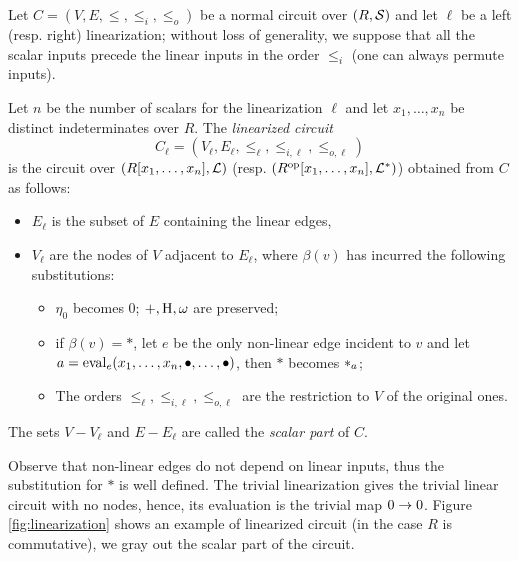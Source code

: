 \begin{definition}
  Let $C=(V,E,\le,\le_i,\le_o)$ be a normal circuit over $(R,\mathcal{S})$
  and let $\ell$ be a left (resp. right) linearization; without loss
  of generality, we suppose that all the scalar inputs precede the
  linear inputs in the order $\le_i$ (one can always permute inputs).
  
  Let $n$ be the number of scalars for the linearization $\ell$ and
  let $x_1,\ldots,x_n$ be distinct indeterminates over $R$. The
  \emph{linearized circuit}
  \begin{equation*}
    C_\ell=(V_\ell,E_\ell,\le_\ell,\le_{i,\ell},\le_{o,\ell})
  \end{equation*}
  is the circuit over $(R[x_1,\ldots,x_n], \mathcal{L})$
  (resp. $(R^{\mathrm{op}}[x_1,\ldots,x_n],\mathcal{L}^\ast)$) obtained from $C$
  as follows:
  \begin{itemize}
  \item $E_\ell$ is the subset of $E$ containing the linear edges,
  \item $V_\ell$ are the nodes of $V$ adjacent to $E_\ell$, where
    $\beta(v)$ has incurred the following substitutions:
    \begin{itemize}
    \item $\eta_0$ becomes $0$; $+, \operatorname{H}, \omega$ are preserved;
    \item if $\beta(v)=*$, let $e$ be the only non-linear edge
      incident to $v$ and let
      $a=\operatorname{eval}_e(x_1,\ldots,x_n,\bullet,\ldots,\bullet)$, then $*$
      becomes $*_{a}$;
    \item The orders $\le_\ell,\le_{i,\ell},\le_{o,\ell}$ are the
      restriction to $V$ of the original ones.
    \end{itemize}
  \end{itemize}

  The sets $V-V_\ell$ and $E-E_\ell$ are called the \emph{scalar part}
  of $C$.
\end{definition}

Observe that non-linear edges do not depend on linear inputs, thus the
substitution for $*$ is well defined. The trivial linearization gives
the trivial linear circuit with no nodes, hence, its evaluation is the
trivial map $0\rightarrow0$. Figure \ref{fig:linearization} shows an example
of linearized circuit (in the case $R$ is commutative), we gray out
the scalar part of the circuit.

